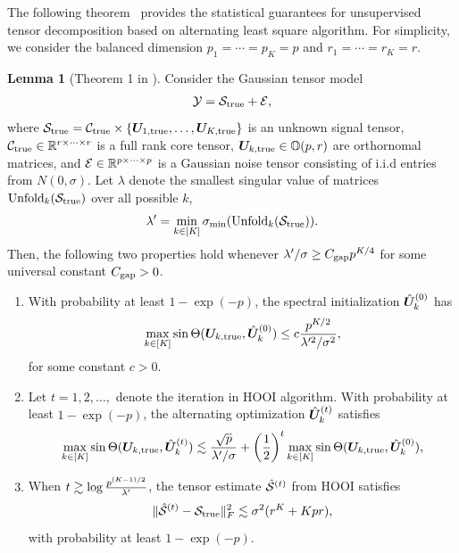 \documentclass[12pt]{article}
\theoremstyle{definition}
\newtheorem{lem}{Lemma}[section]
\begin{document}
The following theorem~\cite{zhang2018tensor} provides the statistical guarantees for unsupervised tensor decomposition based on alternating least square algorithm. For simplicity, we consider the balanced dimension $p_1 =\cdots=p_K =p$ and $r_1 =\cdots=r_K =r$. 
\begin{lem}[Theorem 1 in \cite{zhang2018tensor}]\label{lem:lts}
Consider the Gaussian tensor model
\begin{align}
    \mathcal{Y}  = \mathcal{S}_{\text{true}} + \mathcal{E},
\end{align}
where $\mathcal{S}_{\text{true}} = \mathcal{C}_{\text{true}}\times\{\bm{U}_{1,\text{true}},\ldots,\bm{U}_{K,\text{true}}\}$ is an unknown signal tensor, $\mathcal{C}_{\text{true}}\in\mathbb{R}^{r\times\cdots\times r}$ is a full rank core tensor, $\bm{U}_{k,\text{true}}\in\mathbb{O}(p,r)$ are orthornomal matrices, and $\mathcal{E}\in\mathbb{R}^{p\times \cdots \times p}$ is a Gaussian noise tensor consisting of i.i.d entries from $N(0,\sigma)$. Let $\lambda$ denote the smallest singular value of matrices $\text{Unfold}_k(\mathcal{S}_{\text{true}})$ over all possible $k$, 
\[
\lambda' =\min_{k\in[K]}\sigma_{\min}(\text{Unfold}_k(\mathcal{S}_{\text{true}})).
\]
Then, the following two properties hold whenever $\lambda'/\sigma\geq C_{\textup{gap}}p^{K/4}$ for some universal constant $C_{\textup{gap}}>0$. 

\begin{enumerate}[label=(\alph*)]
\item  With probability at least $1- \exp(-p)$, the spectral initialization $\hat{\bm{U}}_k^{(0)}$ has
\begin{align}
   \max_{k\in[K]}\sin \Theta(\bm{U}_{k,\text{true}},\hat{\bm{U}}_k^{(0)})\leq c \frac{p^{K/2}}{\lambda'^2/\sigma^2},
 \end{align} 
 for some constant $c>0.$

  \item Let $t = 1,2, \ldots,$ denote the  iteration in HOOI algorithm.  With probability at least $1- \exp(-p)$, the alternating optimization $\hat{\bm{U}}_k^{(t)}$ satisfies
 \begin{align}\label{eq:lt}
      \max_{k\in[K]}\sin \Theta(\bm{U}_{k,\text{true}},\hat{\bm{U}}_k^{(t)})\lesssim \frac{\sqrt{p}}{\lambda'/\sigma}+ \left({1\over 2}\right)^t\max_{k\in[K]}\sin \Theta(\bm{U}_{k,\text{true}},\hat{\bm{U}}_k^{(0)}),
 \end{align}
 \item When $t\gtrsim \log {p^{(K-1)/2}\over \lambda'}$, the tensor estimate $\hat {\mathcal{S}}^{(t)}$ from HOOI satisfies
 \[
\lVert\hat {\mathcal{S}}^{(t)}-\mathcal{S}_{\text{true}}\rVert_F^2\lesssim  \sigma^2 (r^K+Kpr),
 \]
 with probability at least $1-\exp(-p)$. 
 \end{enumerate}
\end{lem}
\end{document}
